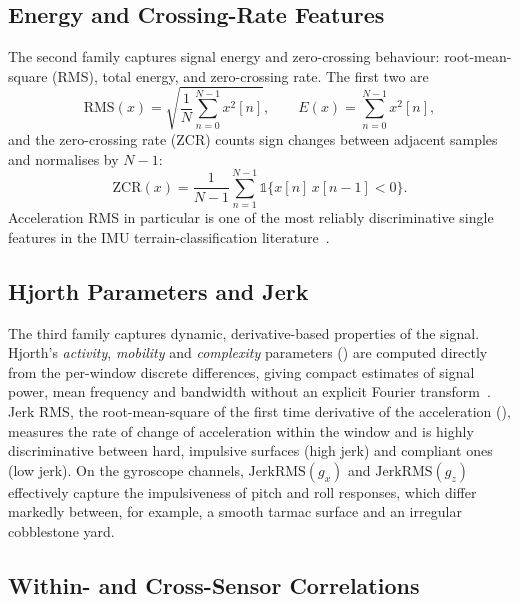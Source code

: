 \subsection{Energy and Crossing-Rate Features}

The second family captures signal energy and zero-crossing behaviour: root-mean-square (RMS), total energy, and zero-crossing rate. The first two are
\begin{equation}
    \mathrm{RMS}(x) = \sqrt{\frac{1}{N}\sum_{n=0}^{N-1} x^{2}[n]},
    \qquad
    E(x) = \sum_{n=0}^{N-1} x^{2}[n],
    \label{eq:rms_energy}
\end{equation}
and the zero-crossing rate (ZCR) counts sign changes between adjacent samples and normalises by $N-1$:
\begin{equation}
    \mathrm{ZCR}(x) = \frac{1}{N-1}\sum_{n=1}^{N-1} \mathbb{1}\bigl\{x[n]\,x[n-1] < 0\bigr\}.
    \label{eq:zcr}
\end{equation}
Acceleration RMS in particular is one of the most reliably discriminative single features in the IMU terrain-classification literature~\cite{Brooks2005,Weiss2011}.

\subsection{Hjorth Parameters and Jerk}

The third family captures dynamic, derivative-based properties of the signal. Hjorth's \emph{activity}, \emph{mobility} and \emph{complexity} parameters () are computed directly from the per-window discrete differences, giving compact estimates of signal power, mean frequency and bandwidth without an explicit Fourier transform~\cite{Hjorth1970}. Jerk RMS, the root-mean-square of the first time derivative of the acceleration (), measures the rate of change of acceleration within the window and is highly discriminative between hard, impulsive surfaces (high jerk) and compliant ones (low jerk). On the gyroscope channels, $\mathrm{JerkRMS}(g_x)$ and $\mathrm{JerkRMS}(g_z)$ effectively capture the impulsiveness of pitch and roll responses, which differ markedly between, for example, a smooth tarmac surface and an irregular cobblestone yard.

\subsection{Within- and Cross-Sensor Correlations}

